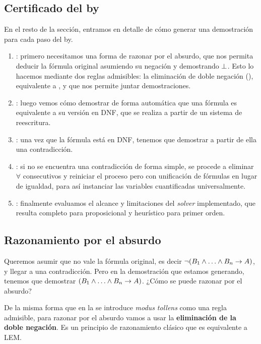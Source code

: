 \subsection{Certificado del by}

En el resto de la sección, entramos en detalle de cómo generar una demostración para cada paso del by.

\begin{enumerate}
    \item {}: primero necesitamos una forma de razonar por el absurdo, que nos permita deducir la fórmula original asumiendo su negación y demostrando $\bot$. Esto lo hacemos mediante dos reglas admisibles: la eliminación de doble negación (), equivalente a , y  que nos permite juntar demostraciones.
    \item {}: luego vemos cómo demostrar de forma automática que una fórmula es equivalente a su versión en DNF, que se realiza a partir de un sistema de reescritura.
    \item {}: una vez que la fórmula está en DNF, tenemos que demostrar a partir de ella una contradicción. 
    \item {}: si no se encuentra una contradicción de forma simple, se procede a eliminar $\forall$ consecutivos y reiniciar el proceso pero con unificación de fórmulas en lugar de igualdad, para así instanciar las variables cuantificadas universalmente.
    \item {}: finalmente evaluamos el alcance y limitaciones del \textit{solver} implementado, que resulta completo para proposicional y heurístico para primer orden.
\end{enumerate}


\subsection{Razonamiento por el absurdo}
\label{ppa-cert:sec:abs-reasoning}

Queremos asumir que no vale la fórmula original, es decir $\fNot (\formTwo_1
\fAnd \dots \fAnd \formTwo_n \fImp \form)$, y llegar a una contradicción. Pero
en la demostración que estamos generando, tenemos que demostrar $(\formTwo_1
\fAnd \dots \fAnd \formTwo_n \fImp \form)$. ¿Cómo se puede razonar por el
absurdo?

De la misma forma que en la  se introduce
\textit{modus tollens} como una regla admisible, para razonar por el absurdo
vamos a usar la \textbf{eliminación de la doble negación}. Es un principio de
razonamiento clásico que es equivalente a LEM.


